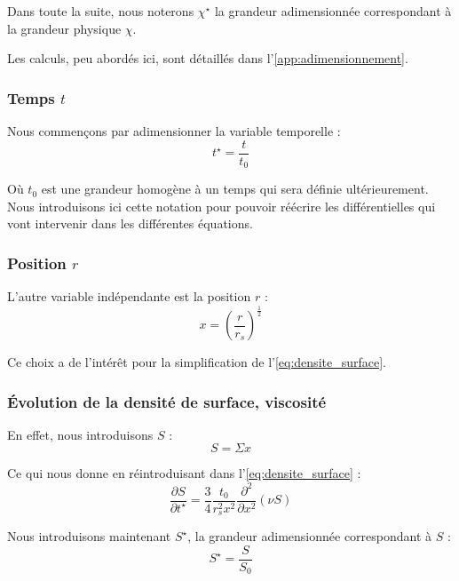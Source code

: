 Dans toute la suite, nous noterons $\chi^\star$ la grandeur adimensionnée
correspondant à la grandeur physique $\chi$.

Les calculs, peu abordés ici, sont détaillés dans
l’\cref{app:adimensionnement}.

\subsubsection{\texorpdfstring{Temps $t$}{Temps t}}

Nous commençons par adimensionner la variable temporelle :
\begin{equation}
    t^\star = \frac{t}{t_0}
\end{equation}

Où $t_0$ est une grandeur homogène à un temps qui sera définie ultérieurement.
Nous introduisons ici cette notation pour pouvoir réécrire les différentielles
qui vont intervenir dans les différentes équations.

\subsubsection{\texorpdfstring{Position $r$}{Position r}}

L’autre variable indépendante est la position $r$ :
\begin{equation}
    \label{eq:position_adim}
    x = \left( \frac{r}{r_s} \right)^\frac{1}{2}
\end{equation}

Ce choix a de l’intérêt pour la simplification de l’\cref{eq:densite_surface}.

\subsubsection{Évolution de la densité de surface, viscosité}

En effet, nous introduisons $S$ :
\begin{equation}
    S = \Sigma x
\end{equation}

Ce qui nous donne en réintroduisant dans l’\cref{eq:densite_surface} :
\begin{equation}
    \frac{\partial S}{\partial t^\star} = \frac{3}{4} \frac{t_0}{r_s^2 x^2} \frac{\partial^2}{\partial x^2} \left(\nu S\right)
\end{equation}

Nous introduisons maintenant $S^\star$, la grandeur adimensionnée correspondant
à $S$ :
\begin{equation}
    S^\star = \frac{S}{S_0}
\end{equation}


